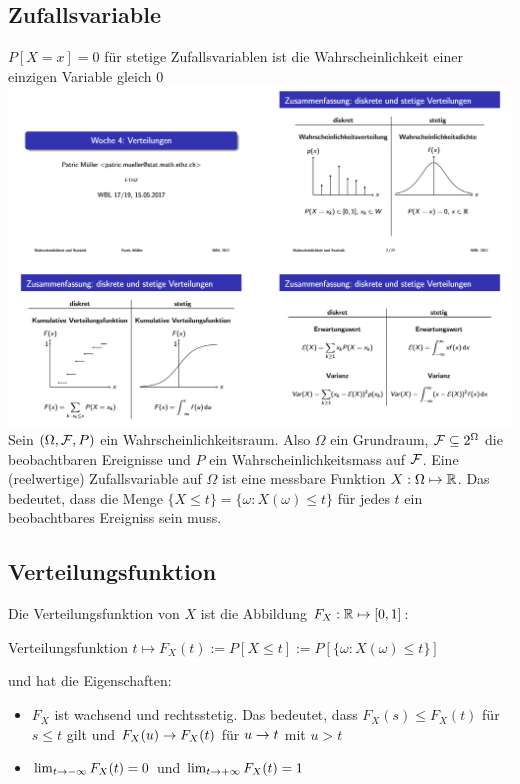 \subsection{Zufallsvariable}
$P[X = x] = 0$
für stetige Zufallsvariablen ist die Wahrscheinlichkeit einer einzigen Variable gleich 0\\
\includegraphics[width=\columnwidth]{diskrete_stetige_verteilung.png}\\
Sein $ (\Omega, \mathcal{F}, P)$ ein Wahrscheinlichkeitsraum. Also $\Omega$ ein
Grundraum, $\mathcal{F} \subseteq 2^\Omega$ die beobachtbaren Ereignisse und $P$ ein
Wahrscheinlichkeitsmass auf $\mathcal{F}$. Eine (reelwertige) Zufallsvariable auf
$\Omega$ ist eine messbare Funktion $X : \Omega \mapsto \mathbb{R}$. Das bedeutet, dass
die Menge $\{X \leq t\} = \{\omega : X (\omega) \leq t\}$ für jedes $t$ ein
beobachtbares Ereigniss sein muss.
\subsection{Verteilungsfunktion}
Die Verteilungsfunktion von $X$ ist die Abbildung $F_X : \mathbb{R} \mapsto [0, 1]$:
\begin{definition}{Verteilungsfunktion}
  $t \mapsto F_X (t) := P[X \leq t] := P[\{\omega : X (\omega) \leq t\}]$
\end{definition}
und hat die Eigenschaften:
\begin{itemize}
  \item $F_X$ ist wachsend und rechtsstetig. Das bedeutet,
        dass $F_X (s) \leq F_X (t)$ für $s \leq t$ gilt und $F_X (u) \rightarrow F_X (t)$
        für $u \rightarrow t$ mit $u > t$
  \item $\lim_{t \rightarrow - \infty} F_X (t) = 0$ und $\lim_{t \rightarrow + \infty} F_X (t) = 1$
\end{itemize}
\BoxStart{}
